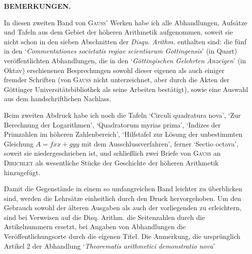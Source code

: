 \clearpage{}\renewcommand{\BookRunningTitle}{Bemerkungen.}
\begin{center}\textbf{BEMERKUNGEN.}\end{center}
In diesen zweiten Band von \textsc{Gauss}’ Werken habe ich alle Abhandlungen, Aufsätze und Tafeln aus dem Gebiet der höheren Arithmetik aufgenommen, soweit sie nicht schon in den sieben Abschnitten der \textit{Disqu. Arithm.} enthalten sind: die fünf in den ‘\textit{Commentationes societatis regiae scientiarum Gottingensis}’ (in Quart) veröffentlichten Abhandlungen, die in den ‘\textit{Göttingischen Gelehrten Anzeigen}’ (in Oktav) erschienenen Besprechungen sowohl dieser eigenen als auch einiger fremder Schriften (von \textsc{Gauss} nicht unterzeichnet, aber durch die Akten der Göttinger Universitätsbibliothek als seine Arbeiten bestätigt), sowie eine Auswahl aus dem handschriftlichen Nachlass.
\par Beim zweiten Abdruck habe ich noch die Tafeln ‘Circuli quadratura nova’, ‘Zur Berechnung der Logarithmen’, ‘Quadratorum myrias prima’, ‘Indizes der Primzahlen im höheren Zahlenbereich’, ‘Hilfstafel zur Lösung der unbestimmten Gleichung $A=fxx+gyy$ mit dem Ausschlussverfahren’, ferner ‘Sectio octava’, soweit sie niedergeschrieben ist, und schließlich zwei Briefe von \textsc{Gauss} an \textsc{Dirichlet} als wesentliche Stücke der Geschichte der höheren Arithmetik hinzugefügt.
\par Damit die Gegenstände in einem so umfangreichen Band leichter zu überblicken sind, werden die Lehrsätze einheitlich durch den Druck hervorgehoben. Um den Gebrauch sowohl der älteren Ausgaben als auch der vorliegenden zu erleichtern, sind bei Verweisen auf die Disq. Arithm. die Seitenzahlen durch die Artikelnummern ersetzt, bei Angaben von Abhandlungen die Veröffentlichungsorte durch die eigenen Titel. Die Anmerkung, die ursprünglich Artikel 2 der Abhandlung ‘\textit{Theorematis arithmetici demonstratio nova}’
